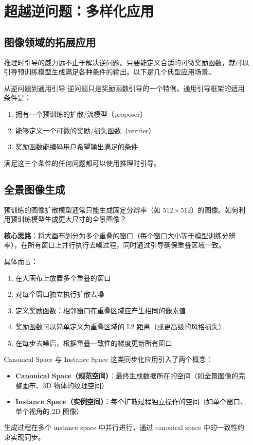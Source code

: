 \documentclass[a4paper]{article}
\begin{document}
\section{超越逆问题：多样化应用}

\subsection{图像领域的拓展应用}

推理时引导的威力远不止于解决逆问题。只要能定义合适的可微奖励函数，就可以引导预训练模型生成满足各种条件的输出。以下是几个典型应用场景。

\begin{knowledgebox}{从逆问题到通用引导}
逆问题只是奖励函数引导的一个特例。通用引导框架的适用条件是：
\begin{enumerate}
    \item 拥有一个预训练的扩散/流模型（proposer）
    \item 能够定义一个可微的奖励/损失函数（verifier）
    \item 奖励函数能编码用户希望输出满足的条件
\end{enumerate}
满足这三个条件的任何问题都可以使用推理时引导。
\end{knowledgebox}

\subsection{全景图像生成}

预训练的图像扩散模型通常只能生成固定分辨率（如 $512 \times 512$）的图像。如何利用预训练模型生成更大尺寸的全景图像？

\textbf{核心思路}：将大画布划分为多个重叠的窗口（每个窗口大小等于模型训练分辨率），在所有窗口上并行执行去噪过程，同时通过引导确保重叠区域一致。

具体而言：
\begin{enumerate}
    \item 在大画布上放置多个重叠的窗口
    \item 对每个窗口独立执行扩散去噪
    \item 定义奖励函数：相邻窗口在重叠区域应产生相同的像素值
    \item 奖励函数可以简单定义为重叠区域的 L2 距离（或更高级的风格损失）
    \item 在每步去噪后，根据重叠一致性的梯度更新所有窗口
\end{enumerate}

\begin{importantbox}{Canonical Space 与 Instance Space}
这类同步化应用引入了两个概念：
\begin{itemize}
    \item \textbf{Canonical Space（规范空间）}：最终生成数据所在的空间（如全景图像的完整画布、3D 物体的纹理空间）
    \item \textbf{Instance Space（实例空间）}：每个扩散过程独立操作的空间（如单个窗口、单个视角的 2D 图像）
\end{itemize}
生成过程在多个 instance space 中并行进行，通过 canonical space 中的一致性约束实现同步。
\end{importantbox}
\end{document}

